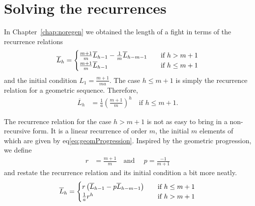 \section{Solving the recurrences}\label{chap:recurrenceAnalysis}

In Chapter~\ref{chap:noregen} we obtained the length of a fight in terms of the recurrence relations
\begin{align}\label{eq:complexRecurrence1}
	\overline{L}_h = \begin{cases}
        \frac{m+1}{m}\overline{L}_{h-1} - \frac{1}{m}\overline{L}_{h-m-1} &\quad \mbox{if } h > m+1\\
        \frac{m+1}{m}\overline{L}_{h-1} &\quad \mbox{if } h \leq m+1
    \end{cases}
\end{align}
and the initial condition $L_1 = \frac{m+1}{ma}$. The case $h \leq m+1$ is simply the recurrence relation for a geometric sequence. Therefore,
\begin{align}
    \overline{L}_h &= \frac{1}{a} {\left( \frac{m+1}{m} \right)}^h \quad \mbox{if } h \leq m+1.\label{eq:geomProgression}
\end{align}

The recurrence relation for the case $h > m+1$ is not as easy to bring in a non-recursive form. It is a linear recurrence of order $m$, the initial $m$ elements of which are given by eq\ref{eq:geomProgression}. Inspired by the geometric progression, we define
\begin{align}
	r &= \frac{m+1}{m} \quad \mbox{and } \quad p = \frac{-1}{m+1}
\end{align}
and restate the recurrence relation and its initial condition a bit more neatly.
\begin{align}\label{eq:complexRecurrence2}
	\overline{L}_h = \begin{cases}
        r\left(\overline{L}_{h-1} - p\overline{L}_{h-m-1}\right) &\quad \mbox{if } h \leq m+1\\
        \frac{1}{a}r^h &\quad \mbox{if } h > m+1
    \end{cases}
\end{align}

